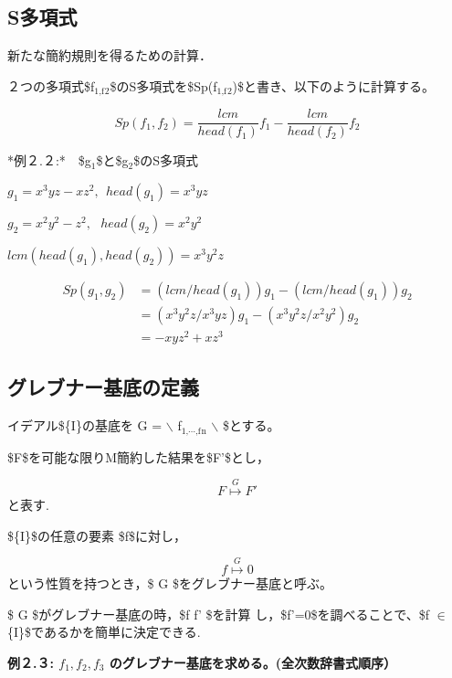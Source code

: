 \documentclass[a4j]{jarticle}
\begin{document}
\subsection{S多項式}
\label{sec:orgec5c7e5}

新たな簡約規則を得るための計算．

２つの多項式\$f\(_{\text{1,f}}\)\(_{\text{2}}\)\$のS多項式を\$Sp(f\(_{\text{1,f}}\)\(_{\text{2}}\))\$と書き、以下のように計算する。

$$Sp(f_1,f_2)= \frac{lcm}{head(f_1)}f_1 - \frac{lcm}{head(f_2)}f_2$$

*例２.２:*　\$g\(_{\text{1}}\)\$と\$g\(_{\text{2}}\)\$のS多項式

\(g_1 = x^3yz - xz^2,\ \   head(g_1) = x^3yz\)

\(g_2 = x^2y^2 - z^2,\ \  \  head(g_2) = x^2y^2\)

\(lcm(head(g_1), head(g_2)) = x^3y^2z\)

$$\begin{array}{ll} 
Sp(g_1,g_2) &= ( lcm / head(g_1) ) g_1 - ( lcm / head(g_1)) g_2 \\
            &= ( x^3y^2z / x^3yz ) g_1 - ( x^3y^2z / x^2y^2 ) g_2 \\
            &= -xyz^2 + xz^3
\end{array}$$

\subsection{グレブナー基底の定義}
\label{sec:org2a2b7f2}

イデアル\$\{\cal I\}\(の基底を\) G = $\backslash${ f\(_{\text{1,}\cdots{}\text{,f}}\)\(_{\text{n}}\) $\backslash$} \$とする。

\$F\$を可能な限りM簡約した結果を\$F'\$とし，

$$F \stackrel{G}{\longmapsto} F'$$ と表す.

\$\{\cal I\}\$の任意の要素 \$f\$に対し，

$$f \stackrel{G}{\longmapsto} 0$$
という性質を持つとき，\$ G \$をグレブナー基底と呼ぶ。

\$ G \$がグレブナー基底の時，\$f \stackrel{\psi}{\longmapsto} f' \$を計算
し，\$f'=0\$を調べることで、\$f \(\in\) \{\cal I\}\$であるかを簡単に決定できる.

\textbf{例２.３: \(f_1,f_2,f_3\) のグレブナー基底を求める。(全次数辞書式順序）}
\end{document}
